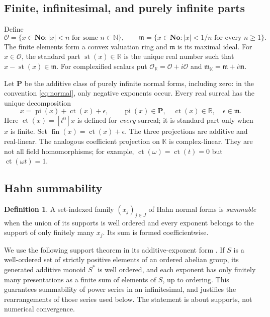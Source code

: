 \documentclass[11pt,a4paper]{article}
\numberwithin{equation}{section}
\theoremstyle{definition}
\newtheorem{definition}[theorem]{Definition}
\theoremstyle{remark}
\newcommand{\No}{\mathbf{No}}
\newcommand{\K}{\mathbb K}
\newcommand{\R}{\mathbb R}
\newcommand{\N}{\mathbb N}
\newcommand{\OO}{\mathcal O}
\newcommand{\mm}{\mathfrak m}
\newcommand{\PP}{\mathbf P}
\newcommand{\ct}{\operatorname{ct}}
\newcommand{\st}{\operatorname{st}}
\newcommand{\fin}{\operatorname{fin}}
\newcommand{\pipart}{\operatorname{pi}}
\newcommand{\abs}[1]{\lvert #1\rvert}
\begin{document}
\subsection{Finite, infinitesimal, and purely infinite parts}

Define
\[
 \OO=\{x\in\No:\abs{x}<n\text{ for some }n\in\N\},\qquad
 \mm=\{x\in\No:\abs{x}<1/n\text{ for every }n\geq1\}.
\]
The finite elements form a convex valuation ring and $\mm$ is its maximal
ideal. For $x\in\OO$, the standard part $\st(x)\in\R$ is the unique real
number such that $x-\st(x)\in\mm$. For complexified scalars put
$\OO_\K=\OO+i\OO$ and $\mm_\K=\mm+i\mm$.

Let $\PP$ be the additive class of purely infinite normal forms, including
zero: in the convention \eqref{eq:normal}, only negative exponents occur.
Every real surreal has the unique decomposition
\begin{equation}\label{eq:three-parts}
 x=\pipart(x)+\ct(x)+\epsilon,
 \qquad \pipart(x)\in\PP,\quad \ct(x)\in\R,\quad \epsilon\in\mm.
\end{equation}
Here $\ct(x)=[t^0]x$ is defined for \emph{every} surreal; it is standard part
only when $x$ is finite. Set $\fin(x)=\ct(x)+\epsilon$. The three projections
are additive and real-linear. The analogous coefficient projection on
$\K$ is complex-linear. They are not all field homomorphisms; for example,
$\ct(\omega)=\ct(t)=0$ but $\ct(\omega t)=1$.

\subsection{Hahn summability}

\begin{definition}
A set-indexed family $(x_j)_{j\in J}$ of Hahn normal forms is
\emph{summable} when the union of its supports is well ordered and every
exponent belongs to the support of only finitely many $x_j$. Its sum is
formed coefficientwise.
\end{definition}

We use the following support theorem in its additive-exponent form
\cite{Neumann}. If $S$ is a well-ordered set of strictly positive elements
of an ordered abelian group, its generated additive monoid $S^*$ is well
ordered, and each exponent has only finitely many presentations as a finite
sum of elements of $S$, up to ordering. This guarantees summability of power
series in an infinitesimal, and justifies the rearrangements of those series
used below. The statement is about supports, not numerical convergence.
\end{document}
